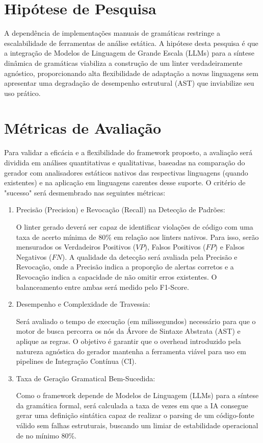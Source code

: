 \documentclass{article}
\begin{document}
\section*{Hipótese de Pesquisa}

A dependência de implementações manuais de gramáticas restringe a escalabilidade de ferramentas de análise estática. A hipótese desta pesquisa é que a integração de Modelos de Linguagem de Grande Escala (LLMs) para a síntese dinâmica de gramáticas viabiliza a construção de um linter verdadeiramente agnóstico, proporcionando alta flexibilidade de adaptação a novas linguagens sem apresentar uma degradação de desempenho estrutural (AST) que inviabilize seu uso prático.

\section*{Métricas de Avaliação}

Para validar a eficácia e a flexibilidade do framework proposto, a avaliação será dividida em análises quantitativas e qualitativas, baseadas na comparação do gerador com analisadores estáticos nativos das respectivas linguagens (quando existentes) e na aplicação em linguagens carentes desse suporte. O critério de "sucesso" será desmembrado nas seguintes métricas:

\begin{enumerate}
\item 
Precisão (Precision) e Revocação (Recall) na Detecção de Padrões:

O linter gerado deverá ser capaz de identificar violações de código com uma taxa de acerto mínima de 80\% em relação aos linters nativos. Para isso, serão mensurados os Verdadeiros Positivos ($VP$), Falsos Positivos ($FP$) e Falsos Negativos ($FN$). A qualidade da detecção será avaliada pela Precisão e Revocação, onde a Precisão indica a proporção de alertas corretos e a Revocação indica a capacidade de não omitir erros existentes. O balanceamento entre ambas será medido pelo F1-Score.

\item 
Desempenho e Complexidade de Travessia:

Será avaliado o tempo de execução (em milissegundos) necessário para que o motor de busca percorra os nós da Árvore de Sintaxe Abstrata (AST) e aplique as regras. O objetivo é garantir que o overhead introduzido pela natureza agnóstica do gerador mantenha a ferramenta viável para uso em pipelines de Integração Contínua (CI).

\item 
Taxa de Geração Gramatical Bem-Sucedida:

Como o framework depende de Modelos de Linguagem (LLMs) para a síntese da gramática formal, será calculada a taxa de vezes em que a IA consegue gerar uma definição sintática capaz de realizar o parsing de um código-fonte válido sem falhas estruturais, buscando um limiar de estabilidade operacional de no mínimo 80\%.
\end{enumerate}
\end{document}
